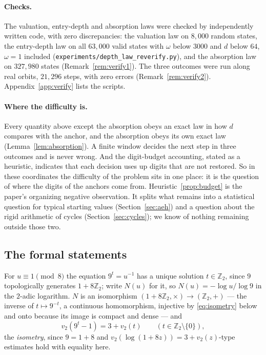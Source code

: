 \documentclass[11pt]{article}
\theoremstyle{remark}
\newcommand{\Z}{\mathbb{Z}}
\newcommand{\vt}[1]{v_2\!\left(#1\right)}
\newcommand{\w}{\omega}
\begin{document}
\paragraph{Checks.} The valuation, entry-depth and absorption laws were checked by independently written code, with zero discrepancies: the valuation law on $8{,}000$ random states, the entry-depth law on all $63{,}000$ valid states with $\w$ below $3000$ and $d$ below $64$, $\w = 1$ included (\texttt{experiments/depth\_law\_reverify.py}), and the absorption law on $327{,}980$ states (Remark~\ref{rem:verify1}).
The three outcomes were run along real orbits, $21{,}296$ steps, with zero errors (Remark~\ref{rem:verify2}). Appendix~\ref{app:verify} lists the scripts.

\paragraph{Where the difficulty is.} Every quantity above except the absorption obeys an exact law in how $d$ compares with the anchor, and the absorption obeys its own exact law (Lemma~\ref{lem:absorption}). A finite window decides the next step in three outcomes and is never wrong. And the digit-budget accounting, stated as a heuristic, indicates that each decision uses up digits that are not restored. So in these coordinates the difficulty of the problem sits in one place: it is the question of where the digits of the anchors come from. Heuristic~\ref{prop:budget} is the paper's organizing negative observation. It splits what remains into a statistical question for typical starting values (Section~\ref{sec:aeh}) and a question about the rigid arithmetic of cycles (Section~\ref{sec:cycles}); we know of nothing remaining outside those two.

\subsection*{The formal statements}

For $u \equiv 1 \pmod 8$ the equation $9^{t} = u^{-1}$ has a unique solution $t \in \Z_2$, since $9$ topologically generates $1 + 8\Z_2$; write $N(u)$ for it, so $N(u) = -\log u/\log 9$ in the $2$-adic logarithm. $N$ is an isomorphism $(1+8\Z_2,\times)\to(\Z_2,+)$ --- the inverse of $t \mapsto 9^{-t}$, a continuous homomorphism, injective by \eqref{eq:isometry} below and onto because its image is compact and dense --- and
\begin{equation}\label{eq:isometry}
\vt{9^t - 1} = 3 + \vt{t}\qquad (t \in \Z_2\setminus\{0\}),
\end{equation}
the \emph{isometry}, since $9 = 1 + 8$ and $\vt{\log(1+8z)} = 3 + \vt{z}$-type estimates hold with equality here.
\end{document}
